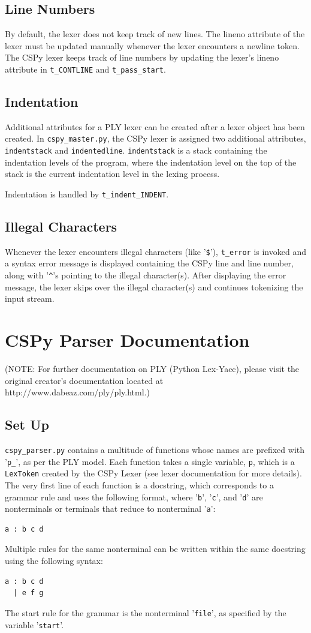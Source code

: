\documentclass{article}
\begin{document}
\subsection{Line Numbers}
By default, the lexer does not keep track of new lines. The lineno attribute of the lexer must be updated manually whenever the lexer encounters a newline token. The CSPy lexer keeps track of line numbers by updating the lexer's lineno attribute in \verb|t_CONTLINE| and \verb|t_pass_start|.

\subsection{Indentation}
Additional attributes for a PLY lexer can be created after a lexer object has been created. In \verb|cspy_master.py|, the CSPy lexer is assigned two additional attributes, \verb|indentstack| and \verb|indentedline|. \verb|indentstack| is a stack containing the indentation levels of the program, where the indentation level on the top of the stack is the current indentation level in the lexing process.

Indentation is handled by \verb|t_indent_INDENT|.

\subsection{Illegal Characters}
Whenever the lexer encounters illegal characters (like '\verb|$|'), \verb|t_error| is invoked and a syntax error message is displayed containing the CSPy line and line number, along with '\verb|^|'s pointing to the illegal character(s). After displaying the error message, the lexer skips over the illegal character(s) and continues tokenizing the input stream.
\pagebreak
\section{CSPy Parser Documentation}
(NOTE: For further documentation on PLY (Python Lex-Yacc), please visit the original
creator's documentation located at http://www.dabeaz.com/ply/ply.html.)
\subsection{Set Up}
\verb|cspy_parser.py| contains a multitude of functions whose names are prefixed with '\verb|p_|', as per the PLY model. Each function takes a single variable, \verb|p|, which is a \verb|LexToken| created by the CSPy Lexer (see lexer documentation for more details). The very first line of each function is a docstring, which corresponds to a grammar rule and uses the following format, where '\verb|b|', '\verb|c|', and '\verb|d|' are nonterminals or terminals that reduce to nonterminal '\verb|a|':
\begin{verbatim}
a : b c d
\end{verbatim}
Multiple rules for the same nonterminal can be written within the same docstring using the following syntax:
\begin{verbatim}
a : b c d
  | e f g
\end{verbatim}
The start rule for the grammar is the nonterminal '\verb|file|', as specified by the variable '\verb|start|'.
\end{document}
